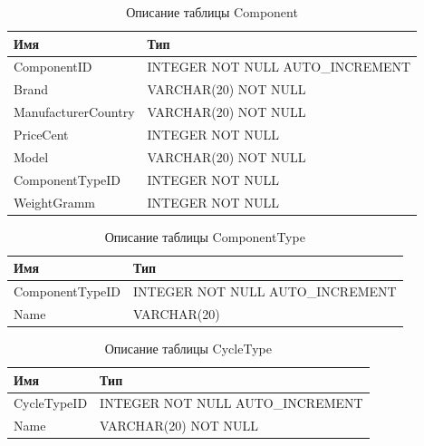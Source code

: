 
\begin{table}[h!] 
	\centering
	\caption{Описание таблицы Component}
	\begin{tabular}{|l|l|}
		\hline \textbf{Имя} & \textbf{Тип} \\
		\hline
		ComponentID &   INTEGER NOT NULL AUTO\_INCREMENT \\ \hline
		Brand & VARCHAR(20) NOT NULL \\ \hline
		ManufacturerCountry &  VARCHAR(20) NOT NULL \\ \hline
		PriceCent & INTEGER NOT NULL \\ \hline
		Model & VARCHAR(20) NOT NULL \\ \hline
		ComponentTypeID &  INTEGER NOT NULL \\ \hline
		WeightGramm &   INTEGER NOT NULL \\ \hline
	\end{tabular}
	\label{tab:component}
\end{table}

\begin{table}[h!] 
	\centering
	\caption{Описание таблицы ComponentType}
	\begin{tabular}{|l|l|}
		\hline \textbf{Имя} & \textbf{Тип} \\
		\hline
		ComponentTypeID &  INTEGER NOT NULL AUTO\_INCREMENT \\ \hline
		Name & VARCHAR(20) \\ \hline
	\end{tabular}
	\label{tab:componenttype}
\end{table}



\begin{table}[h!] 
	\centering
	\caption{Описание таблицы CycleType}
	\begin{tabular}{|l|l|}
		\hline \textbf{Имя} & \textbf{Тип} \\
		\hline
		CycleTypeID &   INTEGER NOT NULL AUTO\_INCREMENT \\ \hline
		Name &  VARCHAR(20) NOT NULL \\ \hline
	\end{tabular}
	\label{tab:cycletype}
\end{table}

